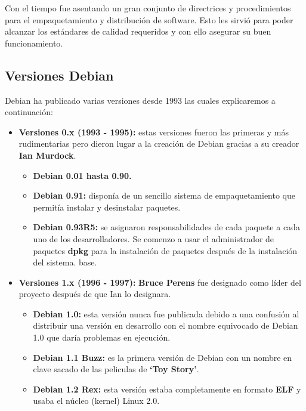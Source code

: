 \documentclass[a4paper, 12pt]{book}
\begin{document}
Con el tiempo fue asentando un gran conjunto de directrices y procedimientos para el empaquetamiento y distribución de software. Esto les sirvió para poder alcanzar los estándares de calidad requeridos y con ello asegurar su buen funcionamiento.

\subsection{Versiones Debian}
\label{subsec:versiones debian}

Debian ha publicado varias versiones desde 1993 las cuales explicaremos a continuación:

\begin{itemize}

	\item \textbf {Versiones 0.x (1993 - 1995):} estas versiones fueron las primeras y más rudimentarias pero dieron lugar a la creación de Debian gracias a su creador \textbf {Ian Murdock}.
	\begin{itemize}
		\item \textbf {Debian 0.01 hasta 0.90.}
		\item \textbf {Debian 0.91:} disponía de un sencillo sistema de empaquetamiento que permitía instalar y desinstalar paquetes.
		\item \textbf {Debian 0.93R5:}  se asignaron responsabilidades de cada paquete a cada uno de los desarrolladores. Se comenzo a usar el administrador de paquetes \textbf {dpkg} para la instalación de paquetes después de la instalación del sistema.
		base.
	\end{itemize}
	\item \textbf {Versiones 1.x (1996 - 1997):} \textbf{Bruce Perens} fue designado como líder del proyecto después de que Ian lo designara.
	\begin{itemize}
		\item \textbf {Debian 1.0:} esta versión nunca fue publicada debido a una confusión al distribuir una versión en desarrollo con el nombre equivocado de Debian 1.0 que daría problemas en ejecución.
		\item \textbf {Debian 1.1 Buzz: } es la primera versión de Debian con un nombre en clave sacado de las peliculas de \textbf {`Toy Story'}.
		\item \textbf {Debian 1.2 Rex: } esta versión estaba completamente en formato \textbf{ELF} y usaba el núcleo (kernel) Linux 2.0.
		

\end{itemize}
\end{itemize}
\end{document}
